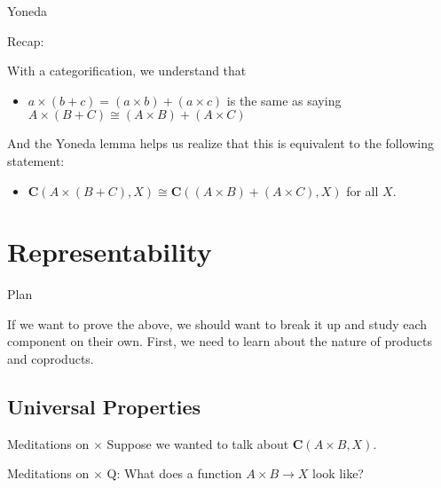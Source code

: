 \documentclass[tikz]{beamer}
\theoremstyle{definition}
\begin{document}
\begin{frame}{Yoneda}

Recap:

\begin{block}{}
    With a categorification, we understand that 
    \begin{itemize}
        \item $a \times (b + c) = (a \times b) + (a \times c)$ is the same as saying $A \times (B + C) \cong (A \times B) + (A \times C)$
    \end{itemize}{}
\end{block}{}

\begin{block}{}
    And the Yoneda lemma helps us realize that this is equivalent to the following statement:
    
    \begin{itemize}
        \item $\mathbf{C}(A \times (B + C), X) \cong \mathbf{C}((A \times B) + (A \times C), X)$ for all $X$.
    \end{itemize}{}
\end{block}{}
    
\end{frame}

\section{Representability}

\begin{frame}{Plan}
    
    If we want to prove the above, we should want to break it up and study each component on their own. First, we need to learn about the nature of products and coproducts.
    
\end{frame}
\subsection{Universal Properties}

\begin{frame}{Meditations on $\times$}
    Suppose we wanted to talk about $\mathbf{C}(A \times B, X)$. 
\end{frame}{}

\begin{frame}{Meditations on $\times$}
    Q: What does a function $A \times B \to X$ look like? 
\end{frame}{}
\end{document}
